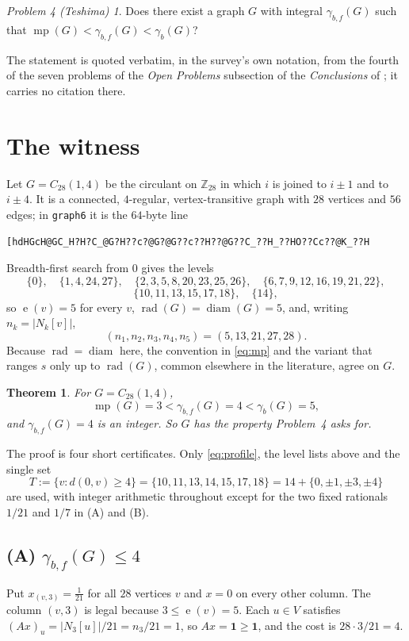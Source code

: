 \documentclass[11pt]{amsart}
\newtheorem{theorem}{Theorem}
\theoremstyle{remark}
\newtheorem*{problem}{Problem 4 (Teshima)}
\newcommand{\mult}{\operatorname{mp}}
\newcommand{\gb}{\gamma_b}
\newcommand{\gbf}{\gamma_{b,f}}
\newcommand{\ecc}{\operatorname{e}}
\newcommand{\rad}{\operatorname{rad}}
\newcommand{\diam}{\operatorname{diam}}
\newcommand{\Zn}[1]{\mathbb Z_{#1}}
\begin{document}
\begin{problem}
Does there exist a graph $G$ with integral $\gbf(G)$ such that
$\mult(G)<\gbf(G)<\gb(G)$?
\end{problem}

\noindent The statement is quoted verbatim, in the survey's own notation, from the fourth of
the seven problems of the \emph{Open Problems} subsection of the \emph{Conclusions} of
\cite{Teshima2014}; it carries no citation there.

\section{The witness}

Let $G=C_{28}(1,4)$ be the circulant on $\Zn{28}$ in which $i$ is joined to $i\pm1$ and to
$i\pm4$. It is a connected, $4$-regular, vertex-transitive graph with $28$ vertices and
$56$ edges; in \texttt{graph6} it is the $64$-byte line
\begin{center}\small
\verb|[hdHGcH@GC_H?H?C_@G?H??c?@G?@G??c??H??@G??C_??H_??HO??Cc??@K_??H|
\end{center}
Breadth-first search from $0$ gives the levels
\[
 \{0\},\quad
 \{1,4,24,27\},\quad
 \{2,3,5,8,20,23,25,26\},\quad
 \{6,7,9,12,16,19,21,22\},
\]
\[
 \{10,11,13,15,17,18\},\quad \{14\},
\]
so $\ecc(v)=5$ for every $v$, $\rad(G)=\diam(G)=5$, and, writing $n_k=|N_k[v]|$,
\begin{equation}\label{eq:profile}
 (n_1,n_2,n_3,n_4,n_5)=(5,13,21,27,28).
\end{equation}
Because $\rad=\diam$ here, the convention in \eqref{eq:mp} and the variant that ranges
$s$ only up to $\rad(G)$, common elsewhere in the literature, agree on $G$.

\begin{theorem}\label{thm:main}
For $G=C_{28}(1,4)$,
\[
 \mult(G)=3<\gbf(G)=4<\gb(G)=5,
\]
and $\gbf(G)=4$ is an integer. So $G$ has the property Problem~4 asks for.
\end{theorem}

The proof is four short certificates. Only \eqref{eq:profile}, the level lists above and
the single set
\begin{equation}\label{eq:T}
 T:=\{v: d(0,v)\ge 4\}=\{10,11,13,14,15,17,18\}=14+\{0,\pm1,\pm3,\pm4\}
\end{equation}
are used, with integer arithmetic throughout except for the two fixed rationals $1/21$
and $1/7$ in (A) and (B).

\subsection*{(A) $\gbf(G)\le4$}
Put $x_{(v,3)}=\tfrac1{21}$ for all $28$ vertices $v$ and $x=0$ on every other column. The
column $(v,3)$ is legal because $3\le \ecc(v)=5$. Each $u\in V$ satisfies
$(Ax)_u=|N_3[u]|/21=n_3/21=1$, so $Ax=\mathbf 1\ge\mathbf 1$, and the cost is
$28\cdot 3/21=4$.
\end{document}

